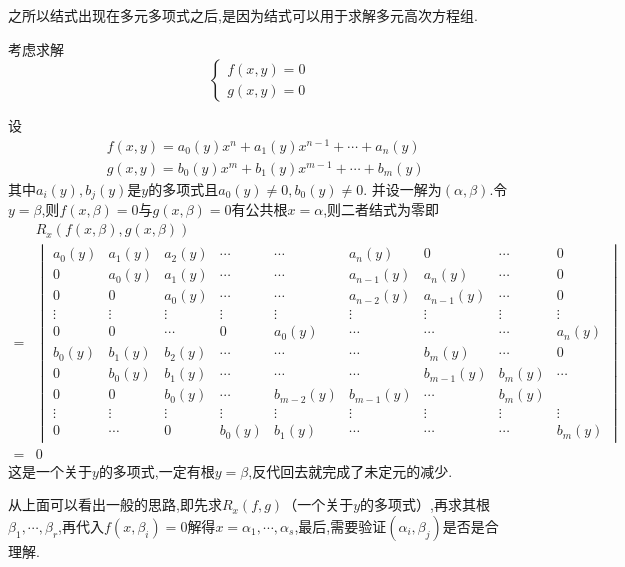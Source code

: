 \begin{red}
\begin{remark}
    之所以结式出现在多元多项式之后,是因为结式可以用于求解多元高次方程组.
\end{remark}
\end{red}
\begin{brown}
\begin{example}
    考虑求解
    \[
    \begin{cases*}
        f\left(x,y\right)=0\\
        g\left(x,y\right)=0
    \end{cases*}
    \]
\end{example}
\begin{solution}
设\begin{align*}
    &f(x, y) = a_0(y)x^n + a_1(y)x^{n-1} + \cdots + a_n(y)\\
&g(x, y) = b_0(y)x^m + b_1(y)x^{m-1} + \cdots + b_m(y)
\end{align*}
其中$a_i\left(y\right),b_j\left(y\right)$是$y$的多项式且$a_0\left(y\right)\neq 0,b_0\left(y\right)\neq 0.$
并设一解为$\left(
    \alpha,\beta
\right)$.令$y=\beta$,则$f\left(x,\beta\right)=0$与$g\left(x,\beta\right)=0$有公共根$x=\alpha$,则二者结式为零即
\newpage
\begin{align*}
    &R_x(f\left(x,\beta\right), g\left(x,\beta\right))\\ =&
\begin{vmatrix}
a_0(y) & a_1(y) & a_2(y) & \cdots&\cdots & a_n(y) & 0 & \cdots & 0 \\
0 & a_0(y) & a_1(y) & \cdots&\cdots & a_{n-1}(y) & a_n(y) & \cdots & 0 \\
0 & 0 & a_0(y) & \cdots&\cdots & a_{n-2}(y) & a_{n-1}(y) & \cdots & 0 \\
\vdots & \vdots & \vdots & \vdots&\vdots & \vdots & \vdots & \vdots & \vdots \\
0 & 0 & \cdots & 0 & a_0(y) & \cdots&\cdots&\cdots & a_n(y) \\
b_0(y) & b_1(y) & b_2(y) & \cdots&\cdots&\cdots & b_m(y) &  \cdots & 0 \\
0 & b_0(y) & b_1(y) & \cdots&\cdots&\cdots & b_{m-1}(y) & b_m(y) & \cdots \\
0 & 0 & b_0(y) & \cdots & b_{m-2}(y) & b_{m-1}(y) & \cdots & b_m(y) \\
\vdots & \vdots & \vdots & \vdots & \vdots & \vdots & \vdots&\vdots & \vdots \\
0 & \cdots & 0 & b_0(y) & b_1(y) & \cdots&\cdots&\cdots & b_m(y)
\end{vmatrix}\\
= &0
\end{align*}
这是一个关于$y$的多项式,一定有根$y=\beta$,反代回去就完成了未定元的减少.
\end{solution}
\end{brown}
\begin{red}
\begin{remark}
    从上面可以看出一般的思路,即先求$R_x\left(f,g\right)$（一个关于$y$的多项式）,再求其根$\beta_1,\cdots,\beta_r$,再代入$f\left(x,\beta_i\right)=0$解得$x=\alpha_1,\cdots,\alpha_s$,最后,需要验证$\left(
        \alpha_i,\beta_j
    \right)$是否是合理解.
\end{remark}
\end{red}